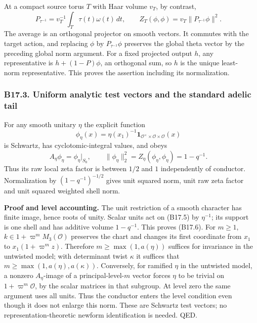 \documentclass[11pt,a4paper]{article}
\theoremstyle{definition}
\begin{document}
At a compact source torus \(T\) with Haar volume \(v_T\), by contrast, \[
 P_{\tau^{-1}}=v_T^{-1}\int_T\tau(t)\omega(t)\,dt,
 \qquad Z_T(\phi,\phi)=v_T\|P_{\tau^{-1}}\phi\|^2.
\tag{B17.4}
\] The average is an orthogonal projector on smooth vectors. It commutes with the target action, and replacing \(\phi\) by \(P_{\tau^{-1}}\phi\) preserves the global theta vector by the preceding global norm argument. For a fixed projected output \(h\), any representative is \(h+(1-P)\phi\), an orthogonal sum, so \(h\) is the unique least-norm representative. This proves the assertion including its normalization.

\subsubsection{B17.3. Uniform analytic test vectors and the standard adelic tail}\label{b17.3.-uniform-analytic-test-vectors-and-the-standard-adelic-tail}

For any smooth unitary \(\eta\) the explicit function \[
 \phi_\eta(x)=\eta(x_1)^{-1}
       \mathbf1_{\mathcal O^\times\times\mathcal O\times\mathcal O}(x)
\tag{B17.5}
\] is Schwartz, has cyclotomic-integral values, and obeys \[
 A_\eta\phi_\eta=\phi_\eta|_{S_0},\qquad
 \|\phi_\eta\|_2^2=Z_\eta(\phi_\eta,\phi_\eta)=1-q^{-1}.
\tag{B17.6}
\] Thus its raw local zeta factor is between \(1/2\) and \(1\) independently of conductor. Normalization by \((1-q^{-1})^{-1/2}\) gives unit squared norm, unit raw zeta factor and unit squared weighted shell norm.

\textbf{Proof and level accounting.} The unit restriction of a smooth character has finite image, hence roots of unity. Scalar units act on (B17.5) by \(\eta^{-1}\); its support is one shell and has additive volume \(1-q^{-1}\). This proves (B17.6). For \(m\ge1\), \(k\in1+\varpi^mM_3(\mathcal O)\) preserves the chart and changes its first coordinate from \(x_1\) to \(x_1(1+\varpi^m z)\). Therefore \(m\ge\max(1,a(\eta))\) suffices for invariance in the untwisted model; with determinant twist \(\kappa\) it suffices that \(m\ge\max(1,a(\eta),a(\kappa))\). Conversely, for ramified \(\eta\) in the untwisted model, a nonzero \(A_\eta\)-image of a principal-level-\(m\) vector forces \(\eta\) to be trivial on \(1+\varpi^m\mathcal O\), by the scalar matrices in that subgroup. At level zero the same argument uses all units. Thus the conductor enters the level condition even though it does not enlarge this norm. These are Schwartz test vectors; no representation-theoretic newform identification is needed. QED.
\end{document}

